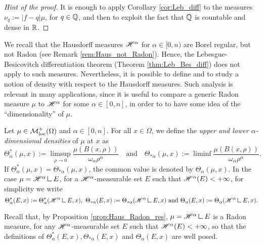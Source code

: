 \begin{proof}[Hint of the proof]
It is enough to apply Corollary \ref{cor:Leb_diff} to the measures $\nu_{q} := |f - q| \mu$, for $q \in \mathbb{Q}$, and then to exploit the fact that $\mathbb{Q}$ is countable and dense in $\mathbb{R}$.
\end{proof}

We recall that the Hausdorff measures $\mathscr{H}^{\alpha}$ for $\alpha \in [0, n)$ are Borel regular, but not Radon (see Remark \ref{rem:Haus_not_Radon}). Hence, the Lebesgue-Besicovitch differentiation theorem (Theorem \ref{thm:Leb_Bes_diff}) does not apply to such measures. Nevertheless, it is possible to define and to study a notion of density with respect to the Hausdorff measures. Such analysis is relevant in many applications, since it is useful to compare a generic Radon measure $\mu$ to $\mathscr{H}^{\alpha}$ for some $\alpha \in [0, n]$, in order to to have some idea of the ``dimensionality'' of $\mu$.

\begin{definition}
Let $\mu \in \mathcal{M}^{+}_{\rm loc}(\Omega)$ and $\alpha \in [0, n]$. For all $x \in \Omega$, we define the {\em upper and lower $\alpha$-dimensional densities} of $\mu$ at $x$ as
\begin{equation*}
\Theta^{*}_{\alpha}(\mu, x) := \limsup_{\rho \to 0} \frac{\mu(B(x, \rho))}{\omega_{\alpha} \rho^{\alpha}} \quad \text{and} \quad \Theta_{* \alpha}(\mu, x) := \liminf \frac{\mu(B(x, \rho))}{\omega_{\alpha} \rho^{\alpha}}.
\end{equation*}
If $\Theta^{*}_{\alpha}(\mu, x) = \Theta_{* \alpha}(\mu, x)$, the common value is denoted by $\Theta_{\alpha}(\mu, x)$.
In the case $\mu = \Haus{\alpha} \res E$, for a $\mathscr{H}^{\alpha}$-measurable set $E$ such that $\mathscr{H}^{\alpha}(E) < + \infty$, for simplicity we write
\begin{equation*}
\Theta^{*}_{\alpha}(E, x) := \Theta^{*}_{\alpha}(\Haus{\alpha} \res E, x), \ \Theta_{* \alpha}(E, x) := \Theta_{* \alpha}(\Haus{\alpha} \res E, x) \text{ and }  \Theta_{\alpha}(E, x) := \Theta_{\alpha}(\Haus{\alpha} \res E, x).
\end{equation*}
\end{definition}
Recall that, by Proposition \ref{prop:Haus_Radon_res}, $\mu = \Haus{\alpha} \res E$ is a Radon measure, for any $\mathscr{H}^{\alpha}$-measurable set $E$ such that $\mathscr{H}^{\alpha}(E) < + \infty$, so that the definitions of $\Theta^{*}_{\alpha}(E, x), \Theta_{* \alpha}(E, x)$ and $\Theta_{\alpha}(E, x)$ are well posed.

